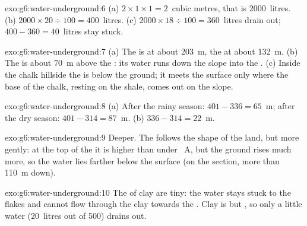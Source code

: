 \begin{solution}{exo:g6:water-underground:6}
(a) $2 \times 1 \times 1 = 2$~cubic metres, that is 2000~litres.
(b) $2000 \times 20 \div 100 = 400$~litres. (c) $2000 \times 18 \div 100 =
360$~litres drain out; $400 - 360 = 40$~litres stay stuck.
\end{solution}

\begin{solution}{exo:g6:water-underground:7}
(a) The  is at about 203~m, the  at about 132~m. (b) The 
is about 70~m above the : its water runs down the slope into the .
(c) Inside the chalk hillside the  is below the ground; it meets
the surface only where the base of the chalk, resting on the 
shale, comes out on the slope.
\end{solution}

\begin{solution}{exo:g6:water-underground:8}
(a) After the rainy season: $401 - 336 = 65$~m; after the dry season:
$401 - 314 = 87$~m. (b) $336 - 314 = 22$~m.
\end{solution}

\begin{solution}{exo:g6:water-underground:9}
Deeper. The  follows the shape of the land, but more gently: at
the top of the  it is higher than under ~A, but the ground rises
much more, so the water lies farther below the surface (on the section,
more than 110~m down).
\end{solution}

\begin{solution}{exo:g6:water-underground:10}
The  of clay are tiny: the water stays stuck to the flakes and cannot
flow through the clay towards the . Clay is  but , so
only a little water (20~litres out of 500) drains out.
\end{solution}

